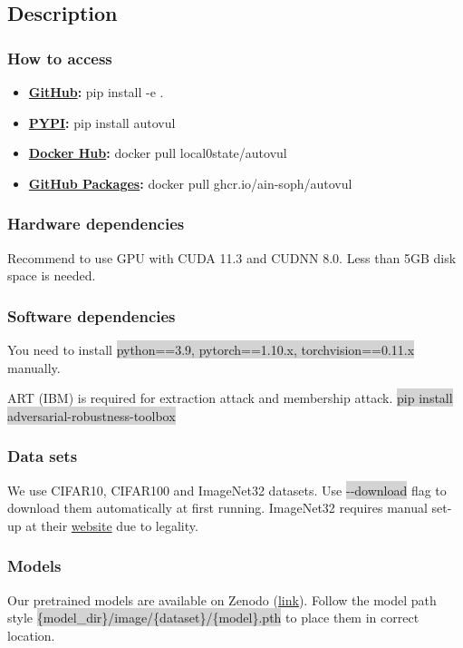 \documentclass[letterpaper,twocolumn,10pt]{article}
\begin{document}
{%
\subsection{Description}

\subsubsection{How to access}

{\small
\begin{itemize}
    \item {\bf \href{https://github.com/ain-soph/autovul}{GitHub}: } pip install -e .
    \item {\bf \href{https://pypi.org/project/autovul/}{PYPI}: } pip install autovul
    \item {\bf \href{https://hub.docker.com/r/local0state/autovul}{Docker Hub}: } docker pull local0state/autovul
    \item {\bf \href{https://github.com/ain-soph/autovul/pkgs/container/autovul}{GitHub Packages}: } docker pull ghcr.io/ain-soph/autovul
\end{itemize}

\subsubsection{Hardware dependencies}
Recommend to use GPU with CUDA 11.3 and CUDNN 8.0. Less than 5GB disk space is needed.
\subsubsection{Software dependencies}
You need to install \colorbox{lightgray}{python==3.9, pytorch==1.10.x, torchvision==0.11.x} manually.

ART (IBM) is required for extraction attack and membership attack. \colorbox{lightgray}{pip install adversarial-robustness-toolbox}

\subsubsection{Data sets}
We use CIFAR10, CIFAR100 and ImageNet32 datasets. Use \colorbox{lightgray}{-{}-download} flag to download them automatically at first running. ImageNet32 requires manual set-up at their \href{https://image-net.org/download-images.php}{website} due to legality.
\subsubsection{Models}
Our pretrained models are available on Zenodo (\href{https://zenodo.org/record/5762440}{link}). Follow the model path style \colorbox{lightgray}{\{model\_dir\}/image/\{dataset\}/\{model\}.pth} to place them in correct location.

}}
\end{document}
